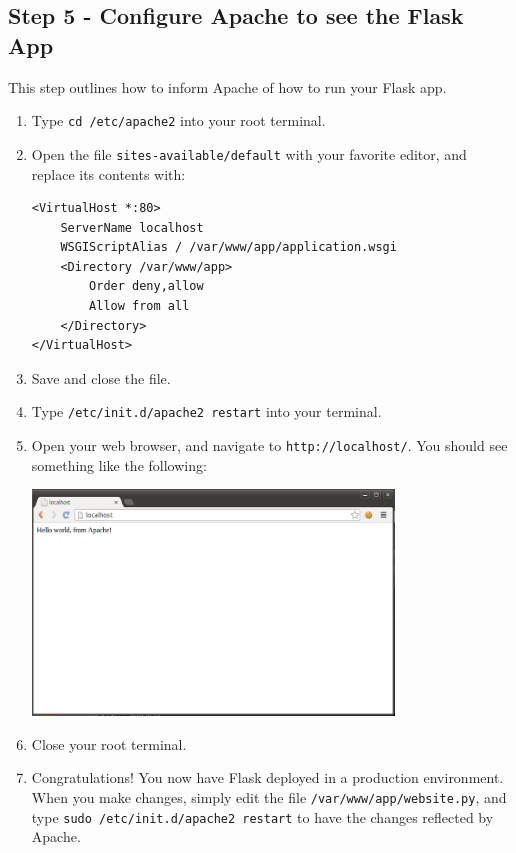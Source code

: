 \documentclass{article}
\begin{document}
\subsection{Step 5 - Configure Apache to see the Flask App}
This step outlines how to inform Apache of how to run your Flask app.
\begin{enumerate}
\item Type \verb+cd /etc/apache2+ into your root terminal.
\item Open the file \verb+sites-available/default+ with your favorite editor, and
replace its contents with:
\begin{verbatim}
<VirtualHost *:80>
	ServerName localhost
    WSGIScriptAlias / /var/www/app/application.wsgi
    <Directory /var/www/app>
        Order deny,allow
        Allow from all
    </Directory>
</VirtualHost>
\end{verbatim}
\item Save and close the file.
\item Type \verb+/etc/init.d/apache2 restart+ into your terminal.
\item Open your web browser, and navigate to \verb+http://localhost/+. You should see something
like the following:

\includegraphics[height=6cm]{pic5.png}

\item Close your root terminal.
\item Congratulations! You now have Flask deployed in a production environment. When you make
changes, simply edit the file \verb+/var/www/app/website.py+, and type \verb+sudo /etc/init.d/apache2 restart+ to have the changes reflected by Apache.
\end{enumerate}
\end{document}
